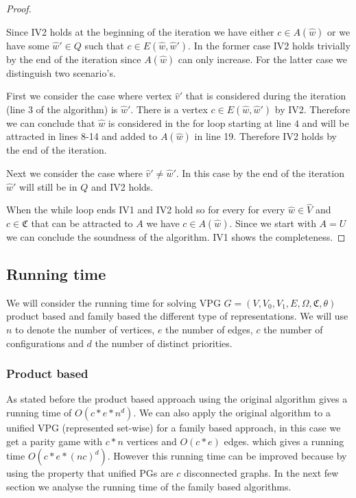 \begin{theorem}
\begin{proof}
\begin{itemize}
			Since IV2 holds at the beginning of the iteration we have either $c \in A(\hat{w})$ or we have some $\hat{w}' \in Q$ such that $c \in E(\hat{w},\hat{w}')$. In the former case IV2 holds trivially by the end of the iteration since $A(\hat{w})$ can only increase. For the latter case we distinguish two scenario's. 
			
			First we consider the case where vertex $\hat{v}'$ that is considered during the iteration (line 3 of the algorithm) is $\hat{w}'$. There is a vertex $c \in E(\hat{w},\hat{w}')$ by IV2. Therefore we can conclude that $\hat{w}$ is considered in the for loop starting at line $4$ and will be attracted in lines 8-14 and added to $A(\hat{w})$ in line 19. Therefore IV2 holds by the end of the iteration.
			
			Next we consider the case where $\hat{v}' \neq \hat{w}'$. In this case by the end of the iteration $\hat{w}'$ will still be in $Q$ and IV2 holds.
		\end{itemize}
	
		When the while loop ends IV1 and IV2 hold so for every for every $\hat{w} \in \hat{V}$ and $c \in \mathfrak{C}$ that can be attracted to $A$ we have $c \in A(\hat{w})$. Since we start with $A = U$ we can conclude the soundness of the algorithm. IV1 shows the completeness.
	\end{proof}
\end{theorem}


\subsection{Running time}
We will consider the running time for solving VPG $G = (V,V_0,V_1,E,\Omega,\mathfrak{C},\theta)$ product based and family based the different type  of representations. We will use $n$ to denote the number of vertices, $e$ the number of edges, $c$ the number of configurations and $d$ the number of distinct priorities.

\subsubsection{Product based}
As stated before the product based approach using the original algorithm gives a running time of $O(c * e * n^d)$. We can also apply the original algorithm to a unified VPG (represented set-wise) for a family based approach, in this case we get a parity game with $c*n$ vertices and $O(c*e)$ edges. which gives a running time $O(c*e*(nc)^d)$. However this running time can be improved because by using the property that unified PGs are $c$ disconnected graphs. In the next few section we analyse the running time of the family based algorithms.

